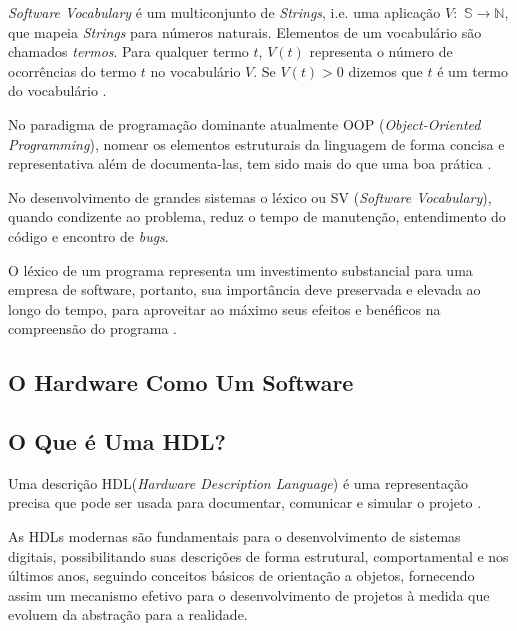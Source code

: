 \documentclass[12pt, twocolumn, a4paper]{article}
\begin{document}
 \textit{Software Vocabulary} é um multiconjunto de \textit{Strings}, i.e. uma aplicação $V:$ $\mathbb{S}\rightarrow\mathbb{N}$, que mapeia \textit{Strings} para números naturais. Elementos de um vocabulário são chamados \textit{termos}. Para qualquer termo $t$, $V(t)$ representa o número de ocorrências do termo $t$ no vocabulário $V$. Se $V(t)>0$ dizemos que $t$ é um termo do vocabulário \cite{Santos2015}.


No paradigma de programação dominante atualmente OOP (\textit{Object-Oriented Programming}), nomear os elementos estruturais da linguagem de forma concisa e representativa além de documenta-las, tem sido mais do que uma boa prática .

 No desenvolvimento de grandes sistemas o léxico ou SV (\textit{Software Vocabulary}), quando condizente ao problema, reduz o tempo de manutenção, entendimento do código e encontro de \textit{bugs}. 

O léxico de um programa representa um investimento substancial para uma empresa de software, portanto, sua importância deve preservada e elevada ao longo do tempo, para aproveitar ao máximo seus efeitos e benéficos na compreensão do programa \cite{Antoniol2007}.

	\subsection{O Hardware Como Um Software}
\quad 

	\subsection{O Que é Uma HDL?}

\quad Uma descrição HDL(\textit{Hardware Description Language}) é uma representação precisa que pode ser usada para documentar, comunicar e simular o projeto \cite{Miller-Karlow}.

As HDLs modernas são fundamentais para o desenvolvimento de sistemas digitais, possibilitando suas descrições de forma estrutural, comportamental e nos últimos anos, seguindo conceitos básicos de orientação a objetos, fornecendo assim um mecanismo efetivo para o desenvolvimento de projetos à medida que evoluem da abstração para a realidade.
\end{document}
